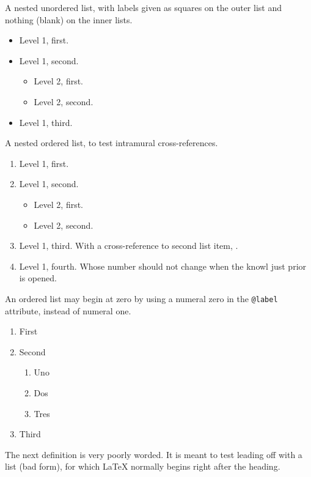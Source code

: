 \documentclass{amsart}
\theoremstyle{plain}%
\theoremstyle{definition}%
\theoremstyle{remark}%
\newcommand{\xreffont}{\relax}
\newcommand{\mono}[1]{\texttt{#1}}
\numberwithin{equation}{section}
\begin{document}
%
\par
A nested unordered list, with labels given as squares on the outer list and nothing (blank) on the inner lists.%
\begin{itemize}[label=$\blacksquare$]
\item{}Level 1, first.%
\item{}Level 1, second.%
\begin{itemize}[label=]
\item{}Level 2, first.%
\item{}Level 2, second.%
\end{itemize}
%
\item{}Level 1, third.%
\end{itemize}
%
\par
A nested ordered list, to test intramural cross-references.%
\begin{enumerate}
\item{}Level 1, first.%
\item\hypertarget{list-item-second}{}Level 1, second.%
\begin{itemize}[label=]
\item{}Level 2, first.%
\item{}Level 2, second.%
\end{itemize}
%
\item{}Level 1, third.  With a cross-reference to second list item, \hyperlink{list-item-second}{{\xreffont 2}}.%
\item{}Level 1, fourth.  Whose number should not change when the knowl just prior is opened.%
\end{enumerate}
%
\par
An ordered list may begin at zero by using a numeral zero in the \mono{@label} attribute, instead of numeral one.%
\begin{enumerate}[label={(\arabic*), start=0}]
\item{}First%
\item{}Second%
\begin{enumerate}[label={-\arabic*-, start=0}]
\item{}Uno%
\item{}Dos%
\item{}Tres%
\end{enumerate}
%
\item{}Third%
\end{enumerate}
%
\par
The next definition is very poorly worded.  It is meant to test leading off with a list (bad form), for which \LaTeX{} normally begins right after the heading.%
\end{document}
